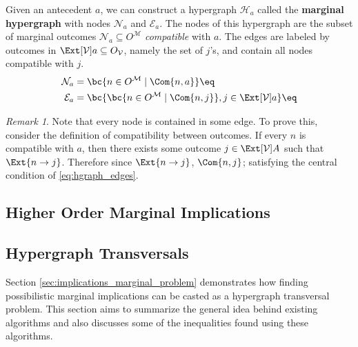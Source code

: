 \documentclass[aps, 10pt, english, twoside, pra, nofootinbib, longbibliography]{revtex4-1}
\theoremstyle{plain}
\theoremstyle{definition}
\theoremstyle{remark}
\newtheorem{remark}[theorem]{Remark}
\newcommand{\hgraph}{\mathcal{H}}
\newcommand{\nodes}{\mathcal{N}}
\newcommand{\edges}{\mathcal{E}}
\newcommand{\term}[1]{\textcolor{Mahogany}{\textbf{#1}}}
\begin{document}

    Given an antecedent $a$, we can construct a hypergraph $\hgraph_{a}$ called the \term{marginal hypergraph} with nodes $\nodes_a$ and $\edges_a$. The nodes of this hypergraph are the subset of marginal outcomes $\nodes_a \subseteq O^{\mathcal{M}}$ \textit{compatible} with $a$.
    The edges are labeled by outcomes in $\Ext[\mathcal{V}]{a} \subseteq O_{\mathcal{V}}$, namely the set of $j$'s, and contain all nodes compatible with $j$.
    \begin{align*}
        \nodes_a &= \bc{n \in O^{\mathcal{M}} \mid \Com{n, a}} \eq \label{eq:hgraph_nodes} \\
        \edges_a &= \bc{\bc{n \in O^{\mathcal{M}} \mid \Com{n, j}} , j \in \Ext[\mathcal{V}]{a}} \eq \label{eq:hgraph_edges}
    \end{align*}
    \begin{remark}
        \label{remark:trivial_transversal}
        Note that every node is contained in some edge. To prove this, consider the definition of compatibility between outcomes. If every $n$ is compatible with $a$, then there exists some outcome $j \in \Ext[\mathcal{V}]{A}$ such that $\Ext{n \to j}$. Therefore since $\Ext{n \to j}$, $\Com{n, j}$; satisfying the central condition of \cref{eq:hgraph_edges}.
    \end{remark}

    \subsection{Higher Order Marginal Implications}


    \subsection{Hypergraph Transversals}
    Section \ref{sec:implications_marginal_problem} demonstrates how finding possibilistic marginal implications can be casted as a hypergraph transversal problem. This section aims to summarize the general idea behind existing algorithms and also discusses some of the inequalities found using these algorithms. 
\end{document}
